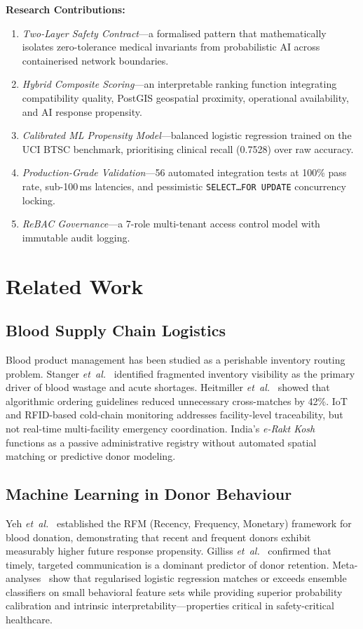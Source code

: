 \documentclass[conference]{IEEEtran}
\begin{document}
\textbf{Research Contributions:}
\begin{enumerate}
  \item \emph{Two-Layer Safety Contract}---a formalised pattern that
        mathematically isolates zero-tolerance medical invariants from
        probabilistic AI across containerised network boundaries.
  \item \emph{Hybrid Composite Scoring}---an interpretable ranking
        function integrating compatibility quality, PostGIS geospatial
        proximity, operational availability, and AI response propensity.
  \item \emph{Calibrated ML Propensity Model}---balanced logistic
        regression trained on the UCI BTSC benchmark, prioritising
        clinical recall (0.7528) over raw accuracy.
  \item \emph{Production-Grade Validation}---56 automated integration
        tests at 100\% pass rate, sub-100\,ms latencies, and
        pessimistic \texttt{SELECT\ldots FOR UPDATE} concurrency locking.
  \item \emph{ReBAC Governance}---a 7-role multi-tenant access control
        model with immutable audit logging.
\end{enumerate}

\section{Related Work}

\subsection{Blood Supply Chain Logistics}
Blood product management has been studied as a perishable inventory
routing problem. Stanger \emph{et~al.}~\cite{stanger2012} identified
fragmented inventory visibility as the primary driver of blood
wastage and acute shortages. Heitmiller \emph{et~al.}~\cite{heitmiller2008}
showed that algorithmic ordering guidelines reduced unnecessary
cross-matches by 42\%. IoT and RFID-based cold-chain monitoring
\cite{roy2021} addresses facility-level traceability, but not
real-time multi-facility emergency coordination. India's \emph{e-Rakt
Kosh}~\cite{eraktkosh2020} functions as a passive administrative
registry without automated spatial matching or predictive donor modeling.

\subsection{Machine Learning in Donor Behaviour}
Yeh \emph{et~al.}~\cite{yeh2009} established the RFM (Recency,
Frequency, Monetary) framework for blood donation, demonstrating
that recent and frequent donors exhibit measurably higher future
response propensity. Gilliss \emph{et~al.}~\cite{gilliss2021}
confirmed that timely, targeted communication is a dominant
predictor of donor retention. Meta-analyses~\cite{baesens2003}
show that regularised logistic regression matches or exceeds
ensemble classifiers on small behavioral feature sets while
providing superior probability calibration and intrinsic
interpretability---properties critical in safety-critical healthcare.
\end{document}
